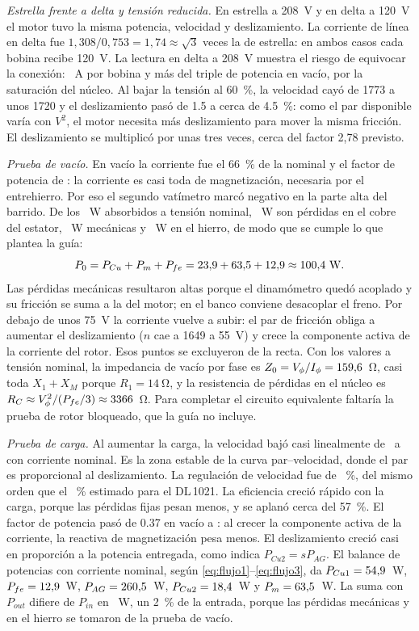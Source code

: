 \documentclass[conference]{IEEEtran}
\begin{document}
\emph{Estrella frente a delta y tensión reducida.} En estrella a \SI{208}{V} y en delta a \SI{120}{V} el motor tuvo la misma potencia, velocidad y deslizamiento. La corriente de línea en delta fue $1{,}308/0{,}753=1{,}74\approx\sqrt3$ veces la de estrella: en ambos casos cada bobina recibe \SI{120}{V}. La lectura en delta a \SI{208}{V} muestra el riesgo de equivocar la conexión: \DdosIF~\si{A} por bobina y más del triple de potencia en vacío, por la saturación del núcleo. Al bajar la tensión al \SI{60}{\percent}, la velocidad cayó de 1773 a unos \SI{1720}{\rpm} y el deslizamiento pasó de \num{1,5} a cerca de \SI{4,5}{\percent}: como el par disponible varía con $V^2$, el motor necesita más deslizamiento para mover la misma fricción. El deslizamiento se multiplicó por unas tres veces, cerca del factor 2,78 previsto.

\emph{Prueba de vacío.} En vacío la corriente fue el \SI{66}{\percent} de la nominal y el factor de potencia de \FPnomVac: la corriente es casi toda de magnetización, necesaria por el entrehierro. Por eso el segundo vatímetro marcó negativo en la parte alta del barrido. De los \PceroNom~\si{W} absorbidos a tensión nominal, \PcuNom~\si{W} son pérdidas en el cobre del estator, \Pmec~\si{W} mecánicas y \PfeNom~\si{W} en el hierro, de modo que se cumple lo que plantea la guía:
\[
P_0=P_{Cu}+P_m+P_{fe}=\PcuNom+\Pmec+\PfeNom\approx\PceroNom~\si{W}.
\]
Las pérdidas mecánicas resultaron altas porque el dinamómetro quedó acoplado y su fricción se suma a la del motor; en el banco conviene desacoplar el freno. Por debajo de unos \SI{75}{V} la corriente vuelve a subir: el par de fricción obliga a aumentar el deslizamiento ($n$ cae a \SI{1649}{\rpm} a \SI{55}{V}) y crece la componente activa de la corriente del rotor. Esos puntos se excluyeron de la recta. Con los valores a tensión nominal, la impedancia de vacío por fase es $Z_0=V_\phi/I_\phi=\Zvac$~\si{\ohm}, casi toda $X_1+X_M$ porque $R_1=\SI{14}{\ohm}$, y la resistencia de pérdidas en el núcleo es $R_C\approx V_\phi^2/(P_{fe}/3)\approx\Rfe$~\si{\ohm}. Para completar el circuito equivalente faltaría la prueba de rotor bloqueado, que la guía no incluye.

\emph{Prueba de carga.} Al aumentar la carga, la velocidad bajó casi linealmente de \Cnvac\ a \Cnomn~\si{\rpm} con corriente nominal. Es la zona estable de la curva par--velocidad, donde el par es proporcional al deslizamiento. La regulación de velocidad fue de \CRV~\%, del mismo orden que el \DLRVest~\% estimado para el DL\,1021. La eficiencia creció rápido con la carga, porque las pérdidas fijas pesan menos, y se aplanó cerca del \SI{57}{\percent}. El factor de potencia pasó de \num{0,37} en vacío a \Cnomfp: al crecer la componente activa de la corriente, la reactiva de magnetización pesa menos. El deslizamiento creció casi en proporción a la potencia entregada, como indica $P_{Cu2}=sP_{AG}$. El balance de potencias con corriente nominal, según \eqref{eq:flujo1}--\eqref{eq:flujo3}, da $P_{Cu1}=\CnomPcuu$~\si{W}, $P_{fe}=\PfeNom$~\si{W}, $P_{AG}=\CnomPag$~\si{W}, $P_{Cu2}=\CnomPcud$~\si{W} y $P_m=\Pmec$~\si{W}. La suma con $P_{out}$ difiere de $P_{in}$ en \CnomResto~\si{W}, un \SI{2}{\percent} de la entrada, porque las pérdidas mecánicas y en el hierro se tomaron de la prueba de vacío.
\end{document}
